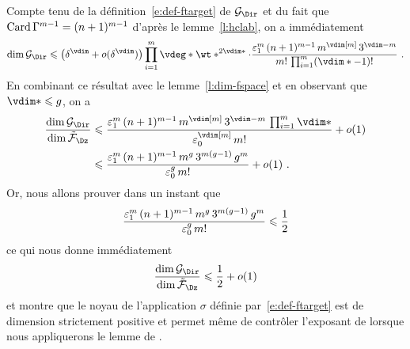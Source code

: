 Compte tenu de la définition~\eqref{e:def-ftarget} de \( \ftarget \) et du fait
que \( \operatorname{Card} \Gamma^{m-1} = (n + 1)^{m-1} \) d'après le
lemme~\ref{l:hclab}, on a immédiatement
\begin{equation}
  \dim \ftarget
  \le
  \bigl(\delta^\vdim + o(\delta^\vdim)\bigr)
  \prod\fctrange \vdeg* \wt*^{2\vdim*}
  \cdot
  \frac {
    \epsi^\puiss
    \, (\dimp + 1)^{\puiss-1}
    \, \puiss^{\vdim[\puiss]}
    \, 3^{\vdim - \puiss}
  }{
    \puiss!
    \, \prod\fctrange (\vdim* - 1)!
  }
  \pmm.
\end{equation}
En combinant ce résultat avec le lemme~\ref{l:dim-fspace} et en observant que
\( \vdim* \le \genre \), on a
\begin{align}
  \frac {\dim \ftarget} {\dim \fspace}
  & \le
  \frac {
    \epsi^\puiss
    \, (\dimp + 1)^{\puiss-1}
    \, \puiss^{\vdim[\puiss]}
    \, 3^{\vdim - \puiss}
    \, \prod\fctrange \vdim*
  }{
    \epsz^{\vdim[\puiss]}
    \, \puiss!
  }
  + o(1)
  \\ & \le
  \frac {
    \epsi^\puiss
    \, (\dimp + 1)^{\puiss-1}
    \, \puiss ^{\genre}
    \, 3 ^{\puiss (\genre-1)}
    \, \genre^\puiss
  }{
    \epsz^\genre
    \, \puiss!
  }
  + o(1)
  \pmm.
\end{align}
Or, nous allons prouver dans un instant que
\begin{equation} \label{e:ct-eps*-siegel}
  \frac {
    \varepsilon\sb1^m
    \, (n + 1)^{m-1}
    \, m ^{g}
    \, 3 ^{m (g-1)}
    \, g^m
  }{
    \varepsilon\sb0^g
    \, m!
  }
  \leqslant
  \frac12
\end{equation}
ce qui nous donne immédiatement
\begin{equation} \label{e:good-codim}
  \frac {\dim \ftarget} {\dim \fspace}
  \le
  \frac12
  + o(1)
\end{equation}
et montre que le noyau de l'application \( \sigma \) définie
par~\eqref{e:def-ftarget} est de dimension strictement positive et permet même
de contrôler l'exposant de  lorsque nous appliquerons le lemme
de \TS.

